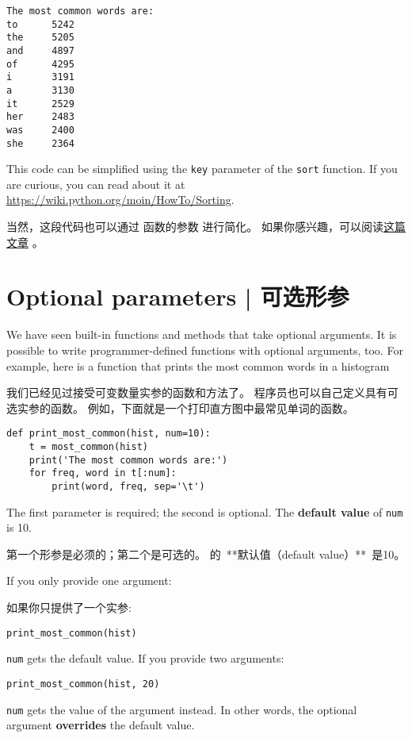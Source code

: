 \begin{lstlisting}
The most common words are:
to      5242
the     5205
and     4897
of      4295
i       3191
a       3130
it      2529
her     2483
was     2400
she     2364
\end{lstlisting}
%
This code can be simplified using the {\tt key} parameter of
the {\tt sort} function.  If you are curious, you can read about it
at \url{https://wiki.python.org/moin/HowTo/Sorting}.

当然，这段代码也可以通过  函数的参数  进行简化。
如果你感兴趣，可以阅读\href{https://wiki.python.org/moin/HowTo/Sorting}{这篇文章} 。

\section{Optional parameters  |  可选形参}


We have seen built-in functions and methods that take optional
arguments.  It is possible to write programmer-defined functions
with optional arguments, too.  For example, here is a function that
prints the most common words in a histogram

我们已经见过接受可变数量实参的函数和方法了。  
程序员也可以自己定义具有可选实参的函数。  
例如，下面就是一个打印直方图中最常见单词的函数。


\begin{lstlisting}
def print_most_common(hist, num=10):
    t = most_common(hist)
    print('The most common words are:')
    for freq, word in t[:num]:
        print(word, freq, sep='\t')
\end{lstlisting}

The first parameter is required; the second is optional.
The {\bf default value} of {\tt num} is 10.

第一个形参是必须的；第二个是可选的。  的\ **默认值（default
value）**\ 是10。


If you only provide one argument:

如果你只提供了一个实参:

\begin{lstlisting}
print_most_common(hist)
\end{lstlisting}
{\tt num} gets the default value.  If you provide two arguments:
\begin{lstlisting}
print_most_common(hist, 20)
\end{lstlisting}
{\tt num} gets the value of the argument instead.  In other
words, the optional argument {\bf overrides} the default value.

